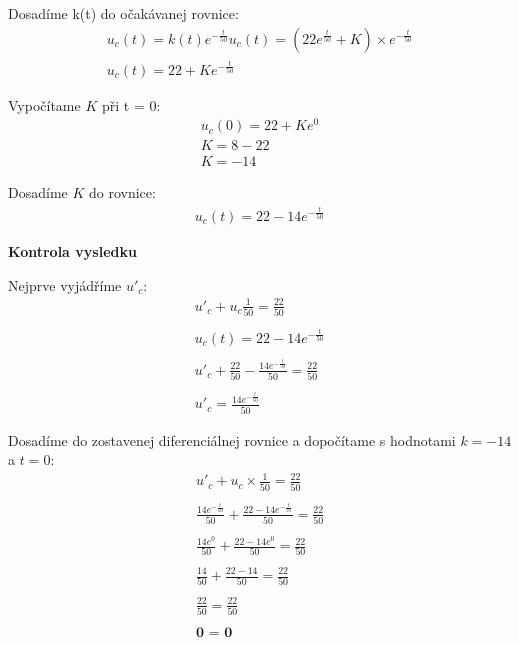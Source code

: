 Dosadíme k(t) do očakávanej rovnice:
\begin{gather*}
    u_c(t) = k(t)e^{-\frac{t}{50}}
    u_c(t) = (22e^{\frac{t}{50}} + K) \times e^{-\frac{t}{50}} \\ 
    u_c(t) = 22 + Ke^{-\frac{t}{50}}
\end{gather*}

Vypočítame $K$ při t = 0:
\begin{gather*}
    u_c(0) = 22 + Ke^0 \\
    K = 8 - 22 \\
    K = -14
\end{gather*}

Dosadíme $K$ do rovnice:
\begin{gather*}
    u_c(t) = 22 - 14e^{-\frac{t}{50}}
\end{gather*}

\newpage

\begin{center}
    \textbf{Kontrola vysledku}
\end{center} 
Nejprve vyjádříme $u'_c$:
\begin{gather*}
    u'_c + u_c\frac{1}{50} = \frac{22}{50} \\\\
    u_c(t) = 22 - 14e^{-\frac{t}{50}} \\\\
    u'_c + \frac{22}{50} - \frac{14e^{-\frac{t}{50}}}{50} = \frac{22}{50} \\\\
    u'_c = \frac{14e^{-\frac{t}{50}}}{50}
\end{gather*}

Dosadíme do zostavenej diferenciálnej rovnice a dopočítame s hodnotami $k = -14$ a $t = 0$:
\begin{gather*}
    u'_c + u_c \times \frac{1}{50} = \frac{22}{50} \\\\
    \frac{ 14e^{ -\frac{t}{50} } }{50} + \frac{ 22 - 14e^{-\frac{t}{50}} }{50} = \frac{22}{50} \\\\
    \frac{ 14e^{0} }{50} + \frac{ 22 - 14e^{0} }{50} = \frac{22}{50} \\\\
    \frac{ 14 }{50} + \frac{ 22 - 14 }{50} = \frac{22}{50} \\\\
    \frac{ 22 }{50} = \frac{22}{50} \\\\
    \textbf{0 = 0}
\end{gather*}